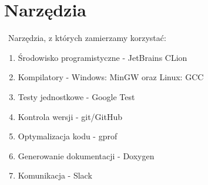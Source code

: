 {\let\clearpage\relax \chapter{Narzędzia}}
\
Narzędzia, z których zamierzamy korzystać:

\begin{enumerate}
\item Środowisko programistyczne - JetBrains CLion
\item Kompilatory - Windows: MinGW oraz Linux: GCC
\item Testy jednostkowe - Google Test
\item Kontrola wersji - git/GitHub
\item Optymalizacja kodu - gprof
\item Generowanie dokumentacji - Doxygen
\item Komunikacja - Slack
\end{enumerate}